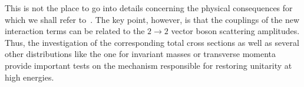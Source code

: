 This is not the place to go into details concerning the physical
consequences for which we shall refer to~\cite{BHKPYZ98}.  The key
point, however, is that the couplings of the new interaction terms can
be related to the $2\to 2$ vector boson scattering amplitudes.  Thus,
the investigation of the corresponding total cross sections as well as
several other distributions like the one for invariant masses or
transverse momenta provide important tests on the mechanism responsible
for restoring unitarity at high energies.

%
%



